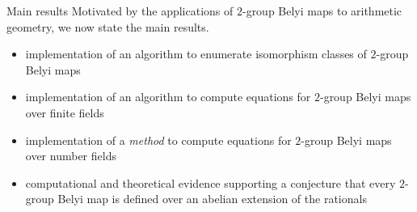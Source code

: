 \documentclass[xcolor=dvipsnames]{beamer}
\theoremstyle{plain}
\begin{document}
{    \begin{frame}{Main results}
      Motivated by the applications of
      $2$-group Belyi maps to arithmetic geometry,
      we now state the main results.
      \pause
      \begin{itemize}
        \item
          implementation of an algorithm to
          enumerate isomorphism classes
          of $2$-group Belyi maps
          \pause
        \item
          implementation of an algorithm to
          compute equations for
          $2$-group Belyi maps
          over finite fields
          \pause
        \item
          implementation of a \emph{method}
          to compute equations for
          $2$-group Belyi maps
          over number fields
          \pause
        \item
          computational and theoretical evidence
          supporting a conjecture that
          every $2$-group Belyi map
          is defined over an
          abelian extension of the rationals
      \end{itemize}
    \end{frame}
  }
\end{document}
